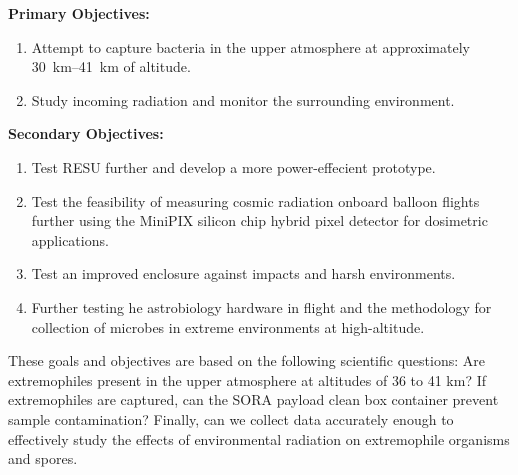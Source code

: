 {\bf Primary Objectives:}
	\begin{enumerate}
	\item Attempt to capture bacteria in the upper atmosphere at approximately \SIrange{30}{41}{\kilo\meter} of altitude.
	\item Study incoming radiation and monitor the surrounding environment.
	\end{enumerate}
{\bf Secondary Objectives:}
	\begin{enumerate}
	\item Test RESU further and develop a more power-effecient prototype.
	\item Test the feasibility of measuring cosmic radiation onboard balloon flights further using the MiniPIX silicon chip hybrid pixel detector for dosimetric applications.
	\item Test an improved enclosure against impacts and harsh environments.
	\item Further testing he astrobiology hardware in flight and the methodology for collection of microbes in extreme environments at high-altitude.
	\end{enumerate}


These goals and objectives are based on the following scientific questions: Are extremophiles present in the upper atmosphere at altitudes of 36 to 41 km?  If extremophiles are captured, can the SORA payload clean box container prevent sample contamination? Finally, can we collect data accurately enough to effectively study the effects of environmental radiation on extremophile organisms and spores.




